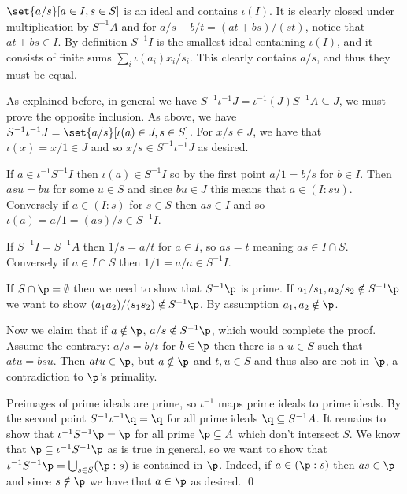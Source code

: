     \benum
        \item $\set{a/s}[a\in I,s\in S]$ is an ideal and contains $\iota(I)$.
        It is clearly closed under multiplication by $S^{-1}A$ and for $a/s+b/t=(at+bs)/(st)$, notice that $at+bs\in I$.
        By definition $S^{-1}I$ is the smallest ideal containing $\iota(I)$, and it consists of finite sums $\sum_i\iota(a_i)x_i/s_i$.
        This clearly contains $a/s$, and thus they must be equal.

        \item As explained before, in general we have $S^{-1}\iota^{-1}J=\iota^{-1}(J)S^{-1}A\subseteq J$, we must prove the opposite inclusion.
        As above, we have $S^{-1}\iota^{-1}J=\set{a/s}[\iota(a)\in J,s\in S]$.
        For $x/s\in J$, we have that $\iota(x)=x/1\in J$ and so $x/s\in S^{-1}\iota^{-1}J$ as desired.

        \item If $a\in\iota^{-1}S^{-1}I$ then $\iota(a)\in S^{-1}I$ so by the first point $a/1=b/s$ for $b\in I$.
        Then $asu=bu$ for some $u\in S$ and since $bu\in J$ this means that $a\in(I:su)$.
        Conversely if $a\in(I:s)$ for $s\in S$ then $as\in I$ and so $\iota(a)=a/1=(as)/s\in S^{-1}I$.

        \item If $S^{-1}I=S^{-1}A$ then $1/s=a/t$ for $a\in I$, so $as=t$ meaning $as\in I\cap S$.
        Conversely if $a\in I\cap S$ then $1/1=a/a\in S^{-1}I$.

        \item If $S\cap\p=\emptyset$ then we need to show that $S^{-1}\p$ is prime.
        If $a_1/s_1,a_2/s_2\notin S^{-1}\p$ we want to show $(a_1a_2)/(s_1s_2)\notin S^{-1}\p$.
        By assumption $a_1,a_2\notin\p$.

        Now we claim that if $a\notin\p$, $a/s\notin S^{-1}\p$, which would complete the proof.
        Assume the contrary: $a/s=b/t$ for $b\in\p$ then there is a $u\in S$ such that $atu=bsu$.
        Then $atu\in\p$, but $a\notin\p$ and $t,u\in S$ and thus also are not in $\p$, a contradiction to $\p$'s primality.

        \item Preimages of prime ideals are prime, so $\iota^{-1}$ maps prime ideals to prime ideals.
        By the second point $S^{-1}\iota^{-1}\q=\q$ for all prime ideals $\q\subseteq S^{-1}A$.
        It remains to show that $\iota^{-1}S^{-1}\p=\p$ for all prime $\p\subseteq A$ which don't intersect $S$.
        We know that $\p\subseteq\iota^{-1}S^{-1}\p$ as is true in general, so we want to show that $\iota^{-1}S^{-1}\p=\bigcup_{s\in S}(\p:s)$ is contained in $\p$.
        Indeed, if $a\in(\p:s)$ then $as\in\p$ and since $s\notin\p$ we have that $a\in\p$ as desired.
        \qed
    \eenum

